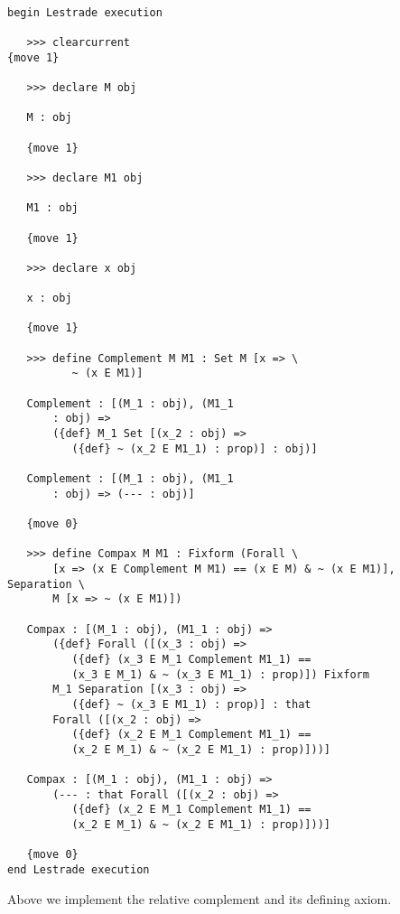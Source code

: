 \documentclass[12pt]{article}
\begin{document}
\begin{verbatim}

begin Lestrade execution

   >>> clearcurrent
{move 1}

   >>> declare M obj

   M : obj

   {move 1}

   >>> declare M1 obj

   M1 : obj

   {move 1}

   >>> declare x obj

   x : obj

   {move 1}

   >>> define Complement M M1 : Set M [x => \
          ~ (x E M1)]

   Complement : [(M_1 : obj), (M1_1 
       : obj) => 
       ({def} M_1 Set [(x_2 : obj) => 
          ({def} ~ (x_2 E M1_1) : prop)] : obj)]

   Complement : [(M_1 : obj), (M1_1 
       : obj) => (--- : obj)]

   {move 0}

   >>> define Compax M M1 : Fixform (Forall \
       [x => (x E Complement M M1) == (x E M) & ~ (x E M1)], Separation \
       M [x => ~ (x E M1)])

   Compax : [(M_1 : obj), (M1_1 : obj) => 
       ({def} Forall ([(x_3 : obj) => 
          ({def} (x_3 E M_1 Complement M1_1) == 
          (x_3 E M_1) & ~ (x_3 E M1_1) : prop)]) Fixform 
       M_1 Separation [(x_3 : obj) => 
          ({def} ~ (x_3 E M1_1) : prop)] : that 
       Forall ([(x_2 : obj) => 
          ({def} (x_2 E M_1 Complement M1_1) == 
          (x_2 E M_1) & ~ (x_2 E M1_1) : prop)]))]

   Compax : [(M_1 : obj), (M1_1 : obj) => 
       (--- : that Forall ([(x_2 : obj) => 
          ({def} (x_2 E M_1 Complement M1_1) == 
          (x_2 E M_1) & ~ (x_2 E M1_1) : prop)]))]

   {move 0}
end Lestrade execution
\end{verbatim}

Above we implement the relative complement and its defining axiom.
\end{document}
